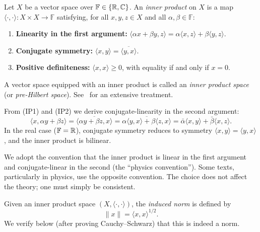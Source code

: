 \documentclass[11pt,a4paper]{article}
\begin{document}
\begin{definition}
\label{def:inner_product}
Let $X$ be a vector space over $\mathbb{F} \in \{\mathbb{R}, \mathbb{C}\}$. An
\emph{inner product} on $X$ is a map
$\langle \cdot, \cdot \rangle \colon X \times X \to \mathbb{F}$ satisfying,
for all $x, y, z \in X$ and all $\alpha, \beta \in \mathbb{F}$:
\begin{enumerate}[label=(IP\arabic*),nosep]
    \item \textbf{Linearity in the first argument:}
          $\langle \alpha x + \beta y, z \rangle
          = \alpha \langle x, z \rangle + \beta \langle y, z \rangle$.
    \item \textbf{Conjugate symmetry:}
          $\langle x, y \rangle = \overline{\langle y, x \rangle}$.
    \item \textbf{Positive definiteness:}
          $\langle x, x \rangle \ge 0$, with equality if and only if $x = 0$.
\end{enumerate}
A vector space equipped with an inner product is called an
\emph{inner product space} (or \emph{pre-Hilbert space}).
See~\cite{kreyszig1989} for an extensive treatment.
\end{definition}

\begin{remark}
\label{rem:ip_consequences}
From (IP1) and (IP2) we derive conjugate-linearity in the second argument:
\[
\langle x, \alpha y + \beta z \rangle
= \overline{\langle \alpha y + \beta z, x \rangle}
= \overline{\alpha \langle y, x \rangle + \beta \langle z, x \rangle}
= \bar{\alpha} \langle x, y \rangle + \bar{\beta} \langle x, z \rangle.
\]
In the real case ($\mathbb{F} = \mathbb{R}$), conjugate symmetry reduces to
symmetry $\langle x, y \rangle = \langle y, x \rangle$, and the inner
product is bilinear.
\end{remark}

\begin{remark}[Convention]
\label{rem:convention}
We adopt the convention that the inner product is linear in the first
argument and conjugate-linear in the second (the ``physics convention'').
Some texts, particularly in physics, use the opposite convention. The choice
does not affect the theory; one must simply be consistent.
\end{remark}

\begin{definition}
\label{def:induced_norm}
Given an inner product space $(X, \langle \cdot, \cdot \rangle)$, the
\emph{induced norm} is defined by
\[
\|x\| = \langle x, x \rangle^{1/2}.
\]
We verify below (after proving Cauchy--Schwarz) that this is indeed a norm.
\end{definition}
\end{document}
